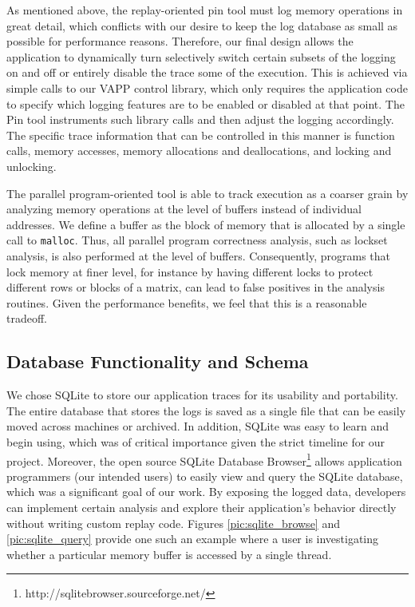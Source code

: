 As mentioned above, the replay-oriented pin tool must log memory
operations in great detail, which conflicts with our desire to
keep the log database as small as possible for performance reasons.
Therefore, our final design allows the application to dynamically
turn selectively switch certain subsets of the logging on and off
or entirely disable the trace some of the execution.  This is
achieved via simple calls to our VAPP control library, which 
only requires the application code to specify which logging
features are to be enabled or disabled at that point.
The Pin tool instruments such library calls and then adjust the
logging accordingly.  The specific trace information that can
be controlled in this manner is function calls, memory accesses,
memory allocations and deallocations, and locking and unlocking.

The parallel program-oriented tool is able to track execution
as a coarser grain by analyzing memory operations at the level
of buffers instead of individual addresses.  We define a buffer
as the block of memory that is allocated by a single call to
\texttt{malloc}.  Thus, all parallel program correctness analysis,
such as lockset analysis, is also performed at the level of buffers.
Consequently, programs that lock memory at finer level, for instance
by having different locks to protect different rows or blocks of a matrix,
can lead to false positives in the analysis routines.
Given the performance benefits, we feel that this is a reasonable tradeoff.

\subsection{Database Functionality and Schema}
We chose SQLite to store our application traces for its usability
and portability.  The entire database that stores the logs is
saved as a single file that can be easily moved across machines
or archived.  In addition, SQLite was easy to learn and begin
using, which was of critical importance given the strict timeline
for our project.  Moreover, the open source
SQLite Database Browser\footnote{http://sqlitebrowser.sourceforge.net/}
allows application programmers (our intended users) to easily view
and query the SQLite database, which was a significant goal of our
work.  By exposing the logged data, developers can implement
certain analysis and explore their application's behavior directly
without writing custom replay code.  Figures \ref{pic:sqlite_browse}
and \ref{pic:sqlite_query}
provide one such an example where a user is investigating
whether a particular memory buffer is accessed by a single thread.


